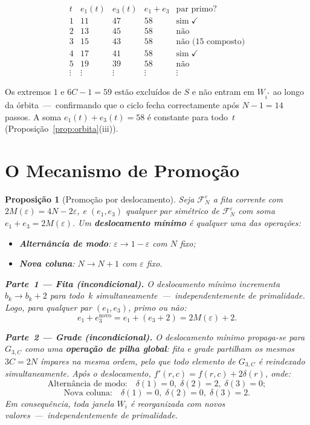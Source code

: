 \documentclass[12pt, a4paper]{article}
\theoremstyle{plain}
\newtheorem{proposition}[theorem]{Proposição}
\theoremstyle{definition}
\theoremstyle{remark}
\begin{document}
	\[
	\begin{array}{c|cc|c|c}
		t & e_1(t) & e_3(t) & e_1+e_3 & \text{par primo?}\\
		\hline
		1 & 11 & 47 & 58 & \text{sim}\;\checkmark\\
		2 & 13 & 45 & 58 & \text{não}\\
		3 & 15 & 43 & 58 & \text{não (15 composto)}\\
		4 & 17 & 41 & 58 & \text{sim}\;\checkmark\\
		5 & 19 & 39 & 58 & \text{não}\\
		\vdots & \vdots & \vdots & \vdots & \vdots
	\end{array}
	\]
	
	Os extremos $1$ e $6C-1=59$ estão excluídos de $S$ e não entram em
	$W_{i^*}$ ao longo da órbita~---~confirmando que o ciclo fecha
	correctamente após $N-1=14$ passos.  A soma $e_1(t)+e_3(t)=58$ é
	constante para todo~$t$ (Proposição~\ref{prop:orbita}(iii)).
	
	\section{O Mecanismo de Promoção}
	\label{sec:promocao}
	
	\begin{proposition}[Promoção por deslocamento]
		\label{prop:promocao}
		Seja $\mathcal{F}_N^\varepsilon$ a fita corrente com
		$2M(\varepsilon)=4N-2\varepsilon$, e $(e_1,e_3)$ qualquer par
		simétrico de $\mathcal{F}_N^\varepsilon$ com soma
		$e_1+e_3=2M(\varepsilon)$.  Um \textbf{deslocamento mínimo} é
		qualquer uma das operações:
		\begin{itemize}
			\item \textbf{Alternância de modo}:
			$\varepsilon\to1-\varepsilon$ com $N$ fixo;
			\item \textbf{Nova coluna}: $N\to N+1$ com $\varepsilon$ fixo.
		\end{itemize}
		
		\medskip
		\textbf{Parte~1 --- Fita (incondicional).}
		O deslocamento mínimo incrementa $b_k\to b_k+2$ para todo~$k$
		simultaneamente~---~independentemente de primalidade.  Logo, para
		qualquer par $(e_1,e_3)$, primo ou não:
		\[
		e_1 + e_3^{\text{novo}}
		= e_1 + (e_3+2)
		= 2M(\varepsilon)+2.
		\]
		
		\medskip
		\textbf{Parte~2 --- Grade (incondicional).}
		O deslocamento mínimo propaga-se para $G_{3,C}$ como uma
		\textbf{operação de pilha global}: fita e grade partilham os
		mesmos $3C=2N$ ímpares na mesma ordem, pelo que todo elemento de
		$G_{3,C}$ é reindexado simultaneamente.  Após o deslocamento,
		$f'(r,c) = f(r,c) + 2\delta(r)$, onde:
		\[
		\text{Alternância de modo:}\quad
		\delta(1)=0,\;\delta(2)=2,\;\delta(3)=0;
		\]
		\[
		\text{Nova coluna:}\quad
		\delta(1)=0,\;\delta(2)=0,\;\delta(3)=2.
		\]
		Em consequência, toda janela $W_i$ é reorganizada com novos
		valores~---~independentemente de primalidade.
	\end{proposition}
	
\end{document}
